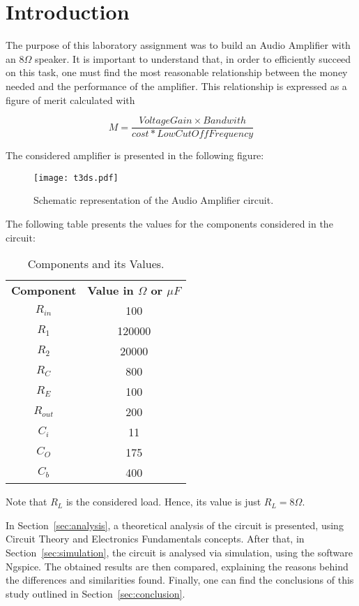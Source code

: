 \newpage
\section{Introduction}
\label{sec:introduction}
\vspace{4.5mm}
\par The purpose of this laboratory assignment was to build an Audio Amplifier with an 8$\Omega$ speaker. It is important to understand that, in order to efficiently succeed on this task, one must find the most reasonable relationship between the money needed and the performance of the amplifier. This relationship is expressed as a figure of merit calculated with 

\begin{equation}
M=\frac{VoltageGain\times Bandwith}{cost*LowCutOffFrequency}
\end{equation}

\par The considered amplifier is presented in the following figure:

\begin{figure}[h] \centering
\texttt{[image: t3ds.pdf]}
\caption{Schematic representation of the Audio Amplifier circuit.}
\label{todos!!}
\end{figure}

The following table presents the values for the components considered in the circuit:

\begin{table}[ht!]
    \centering
    \begin{tabular}{c c}
    \textbf{Component} & \textbf{Value in $\Omega$ or $\mu F$} \\%
    $R_{in}$  & 100 \\
    $R_1$     & 120000 \\
    $R_2$     & 20000  \\
    $R_C$     & 800  \\
    $R_E$     & 100   \\
    $R_{out}$  & 200 \\
    $C_i$     & 11   \\
    $C_O$     & 175 \\
    $C_b$     & 400   \\
    \end{tabular}
    \caption{Components and its Values.}
    \label{tab:compvalues}
\end{table}

Note that $R_L$ is the considered load. Hence, its value is just $R_L=8\Omega$.\par
\par In Section~\ref{sec:analysis}, a theoretical analysis of the circuit is presented, using Circuit Theory and Electronics Fundamentals concepts. After that, in Section~\ref{sec:simulation}, the circuit is analysed via simulation, using the software Ngspice. The obtained results are then compared, explaining the reasons behind the differences and similarities found. Finally, one can find the conclusions of this study outlined in Section~\ref{sec:conclusion}.

